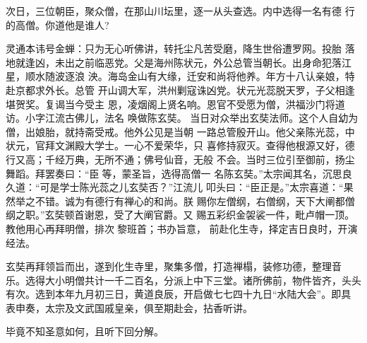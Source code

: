次日，三位朝臣，聚众僧，在那山川坛里，逐一从头查选。内中选得一名有德
行的高僧。你道他是谁人?

灵通本讳号金蝉：只为无心听佛讲，转托尘凡苦受磨，降生世俗遭罗网。投胎
落地就逢凶，未出之前临恶党。父是海州陈状元，外公总管当朝长。出身命犯落江
星，顺水随波逐浪
泱。海岛金山有大缘，迁安和尚将他养。年方十八认亲娘，特赴京都求外长。总管
开山调大军，洪州剿寇诛凶党。状元光蕊脱天罗，子父相逢堪贺奖。复谒当今受主
恩，凌烟阁上贤名响。恩官不受愿为僧，洪福沙门将道访。小字江流古佛儿，法名
唤做陈玄奘。
当日对众举出玄奘法师。这个人自幼为僧，出娘胎，就持斋受戒。他外公见是当朝
一路总管殷开山。他父亲陈光蕊，中状元，官拜文渊殿大学士。一心不爱荣华，只
喜修持寂灭。查得他根源又好，德行又高；千经万典，无所不通；佛号仙音，无般
不会。当时三位引至御前，扬尘舞蹈。拜罢奏曰：“臣等，蒙圣旨，选得高僧一
名陈玄奘。”太宗闻其名，沉思良久道：“可是学士陈光蕊之儿玄奘否？”江流儿
叩头曰：“臣正是。”太宗喜道：“果然举之不错。诚为有德行有禅心的和尚。朕
赐你左僧纲，右僧纲，天下大阐都僧纲之职。”玄奘顿首谢恩，受了大阐官爵。又
赐五彩织金袈裟一件，毗卢帽一顶。教他用心再拜明僧，排次黎班首；书办旨意，
前赴化生寺，择定吉日良时，开演经法。

玄奘再拜领旨而出，遂到化生寺里，聚集多僧，打造禅榻，装修功德，整理音
乐。选得大小明僧共计一千二百名，分派上中下三堂。诸所佛前，物件皆齐，头头
有次。选到本年九月初三日，黄道良辰，开启做七七四十九日“水陆大会”。即具
表申奏，太宗及文武国戚皇亲，俱至期赴会，拈香听讲。

毕竟不知圣意如何，且听下回分解。